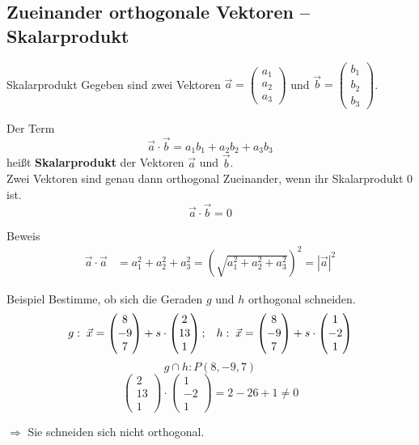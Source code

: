 \documentclass{article}
\begin{document}
\subsection{Zueinander orthogonale Vektoren -- Skalarprodukt}
\begin{boxx}[Red]{Skalarprodukt}
    Gegeben sind zwei Vektoren $\displaystyle \vec{a} = \begin{pmatrix}a_1\\a_2\\a_3\end{pmatrix}$
    und $\displaystyle \vec{b} = \begin{pmatrix}b_1\\b_2\\b_3\end{pmatrix}$.

    Der Term 
    \[\vec{a}\cdot \vec{b} = a_1b_1 + a_2b_2 + a_3b_3\]
    heißt \textbf{Skalarprodukt} der Vektoren $\vec{a}$ und $\vec{b}$.\\

    Zwei Vektoren sind genau dann orthogonal Zueinander, wenn ihr Skalarprodukt $0$ ist.
    \[\vec{a} \cdot \vec{b} = 0\]
\end{boxx}
\begin{boxx}[Purple]{Beweis}
    \begin{align*}
        \vec{a} \cdot \vec{a} &= a_1^2 + a_2^2 + a_3^2 
        = \left(\sqrt{a_1^2 + a_2^2 + a_3^2 }\right)^2 
        = \left|\vec{a}\right|^2
    \end{align*}
\end{boxx}
\begin{boxx}[DarkBlue]{Beispiel}
    Bestimme, ob sich die Geraden $g$ und $h$ orthogonal schneiden.
    \[g:\;\vec{x} = \begin{pmatrix}8\\-9\\7\end{pmatrix} + s \cdot \begin{pmatrix}2\\13\\1\end{pmatrix};\hspace*{3mm}h:\;\vec{x} = \begin{pmatrix}8\\-9\\7\end{pmatrix} + s \cdot \begin{pmatrix}1\\-2\\1\end{pmatrix}\]
    \[g \cap h: P(8,-9,7)\]
    \[\begin{pmatrix}2\\13\\1\end{pmatrix} \cdot \begin{pmatrix}1\\-2\\1\end{pmatrix} = 2 - 26 +1 \not= 0\]
    \begin{center}
        $\Rightarrow$ Sie schneiden sich nicht orthogonal.
    \end{center}
\end{boxx}
\end{document}
